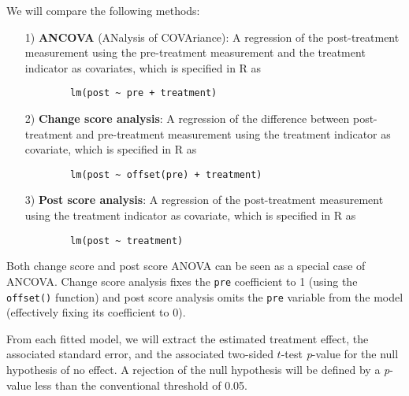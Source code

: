 \documentclass[12pt]{article}
\begin{document}

\begin{examplebox}
We will compare the following methods:
    \begin{itemize}
    \item[1)] \textbf{ANCOVA} (ANalysis of COVAriance): A regression of the post-treatment measurement using the pre-treatment measurement and the treatment indicator as covariates,
    which is specified in R as 
    \begin{verbatim}
        lm(post ~ pre + treatment)
    \end{verbatim}
        
    \item[2)] \textbf{Change score analysis}: A regression of the difference between post-treatment and pre-treatment measurement using the treatment indicator as covariate,
    which is specified in R as 
    \begin{verbatim}
        lm(post ~ offset(pre) + treatment)
    \end{verbatim}
        
    \item[3)] \textbf{Post score analysis}: A regression of the post-treatment measurement using the treatment indicator as covariate,
    which is specified in R as 
    \begin{verbatim}
        lm(post ~ treatment)
    \end{verbatim}
\end{itemize}
Both change score and post score ANOVA can be seen as a special case of ANCOVA. Change score analysis fixes the \texttt{pre} coefficient to 1 (using the \texttt{offset()} function) and post score analysis omits the \texttt{pre} variable from the model (effectively fixing its coefficient to 0).

From each fitted model, we will extract the estimated treatment effect, the associated standard error, and the associated two-sided $t$-test \textit{p}-value for the null hypothesis of no effect. A rejection of the null hypothesis will be defined by a \textit{p}-value less than the conventional threshold of 0.05.
\end{examplebox} 
\end{document}
